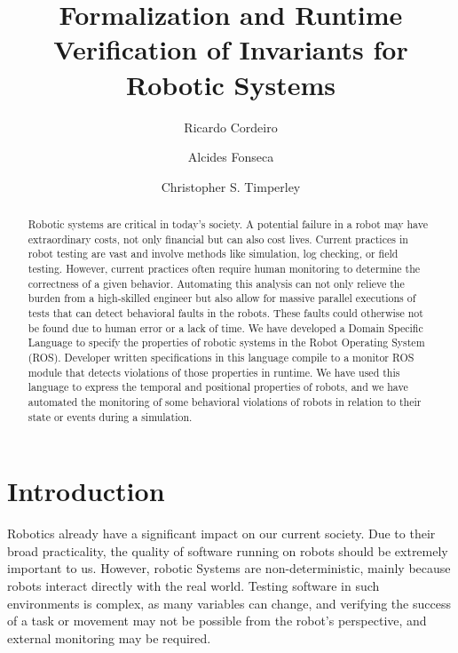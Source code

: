 \documentclass[runningheads]{llncs}
\begin{document}
\title{Formalization and Runtime Verification of Invariants for
Robotic Systems}

\author{Ricardo Cordeiro \and
Alcides Fonseca \and
Christopher S. Timperley}



\maketitle

\begin{abstract}
    Robotic systems are critical in today's society. A potential failure in a robot may have extraordinary costs, not only financial but can also cost lives.
    Current practices in robot testing are vast and involve methods like simulation, log checking, or field testing. However, current practices often require human monitoring to determine the correctness of a given behavior. Automating this analysis can not only relieve the burden from a high-skilled engineer but also allow for massive parallel executions of tests that can detect behavioral faults in the robots. These faults could otherwise not be found due to human error or a lack of time.
    We have developed a Domain Specific Language to specify the properties of robotic systems in the Robot Operating System (ROS). Developer written specifications in this language compile to a monitor ROS module that detects violations of those properties in runtime. We have used this language to express the temporal and positional properties of robots, and we have automated the monitoring of some behavioral violations of robots in relation to their state or events during a simulation.

\end{abstract}


\section{Introduction}

Robotics already have a significant impact on our current society. Due to their broad practicality, the quality of software running on robots should be extremely important to us. However, robotic Systems are non-deterministic, mainly because robots interact directly with the real world. Testing software in such environments is complex, as many variables can change, and verifying the success of a task or movement may not be possible from the robot's perspective, and external monitoring may be required.
\end{document}
